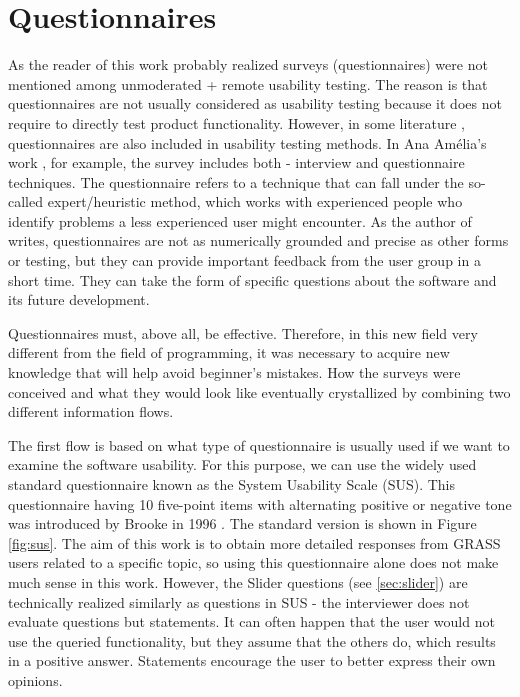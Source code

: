 \documentclass[a4paper,10pt,twoside]{article}
\begin{document}
\newpage
\vspace*{-1cm}
\section{Questionnaires}
\label{sec:questionnaires}

\noindent As the reader of this work probably realized surveys (questionnaires) were not mentioned among unmoderated + remote usability testing. The reason is that questionnaires are not usually considered as usability testing because it does not require to directly test product functionality. However, in some literature \cite{amelia} \cite{sixusability}, questionnaires are also included in usability testing methods. In Ana Amélia's work \cite{amelia}, for example, the survey includes both - interview and questionnaire techniques. The questionnaire refers to a technique that can fall under the so-called expert/heuristic method, which works with experienced people who identify problems a less experienced user might encounter. As the author of \cite{sixusability} writes, questionnaires are not as numerically grounded and precise as other forms or testing, but they can provide important feedback from the user group in a short time. They can take the form of specific questions about the software and its future development.

Questionnaires must, above all, be effective. Therefore, in this new field very different from the field of programming, it was necessary to acquire new knowledge that will help avoid beginner's mistakes. How the surveys were conceived and what they would look like eventually crystallized by combining two different information flows.

The first flow is based on what type of questionnaire is usually used if we want to examine the software usability. For this purpose, we can use the widely used standard questionnaire known as the System Usability Scale (SUS). This questionnaire having 10 five-point items with alternating positive or negative tone was introduced by Brooke in 1996 \cite{sus}. The standard version is shown in Figure \ref{fig:sus}. The aim of this work is to obtain more detailed responses from GRASS users related to a specific topic, so using this questionnaire alone does not make much sense in this work. However, the Slider questions (see \ref{sec:slider}) are technically realized similarly as questions in SUS - the interviewer does not evaluate questions but statements. It can often happen that the user would not use the queried functionality, but they assume that the others do, which results in a positive answer. Statements encourage the user to better express their own opinions.
\end{document}
